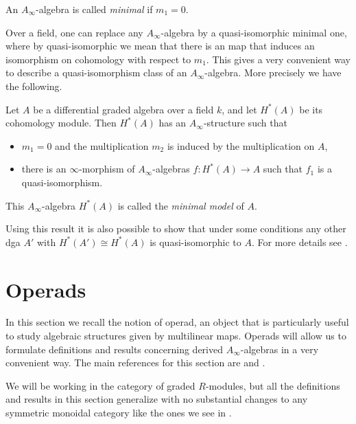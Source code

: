 \documentclass[Thesis.tex]{subfiles}
\begin{document}
\begin{defin}\label{minimal}
An $A_\infty$-algebra is called \emph{minimal} if $m_1 = 0$.
\end{defin}

Over a field, one can replace any $A_\infty$-algebra by a quasi-isomorphic minimal one, where by quasi-isomorphic we mean that there is an map that induces an isomorphism on cohomology with respect to $m_1$. This gives a very convenient way to describe a quasi-isomorphism class of an $A_\infty$-algebra. More precisely we have the following.

\begin{thm}[Kadeishvili]\label{minimaltheorem} Let $A$ be a differential graded algebra over a field $k$, and let $H^*(A)$ be its cohomology module. Then $H^*(A)$ has an $A_\infty$-structure such that
\begin{itemize}
\item $m_1 = 0$ and the multiplication $m_2$ is induced by the multiplication on $A$,
\item there is an $\infty$-morphism of $A_\infty$-algebras $f : H^*(A) \to A$ such that $f_1$ is a quasi-isomorphism.
\end{itemize}
This $A_\infty$-algebra $H^*(A)$ is called the \emph{minimal model} of $A$.
\end{thm}

Using this result it is also possible to show that under some conditions any other dga $A'$ with $H^*(A')\cong H^*(A)$ is quasi-isomorphic to $A$. For more details see \cite{kade}.
\section{Operads}\label{back3}

In this section we recall the notion of operad, an object that is particularly useful to study algebraic structures given by multilinear maps. Operads will allow us to formulate definitions and results concerning derived $A_\infty$-algebras in a very convenient way. The main references for this section are \cite{lodayvallette} and \cite{ward}.

We will be working in the category of graded $R$-modules, but all the definitions and results in this section generalize with no substantial changes to any symmetric monoidal category like the ones we see in . 
\end{document}
